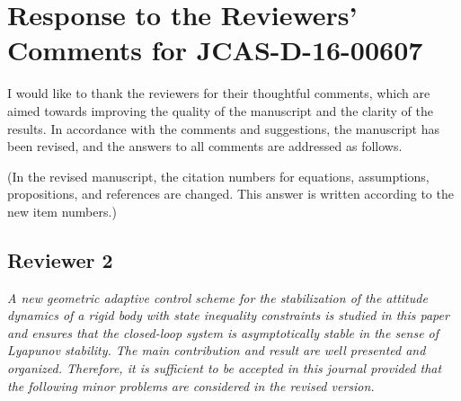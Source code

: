 \documentclass[11pt]{article}
\begin{document}

\section*{Response to the Reviewers' Comments for JCAS-D-16-00607}

I would like to thank the reviewers for their thoughtful comments, which are aimed towards improving the quality of the manuscript and the clarity of the results. 
In accordance with the comments and suggestions, the manuscript has been revised, and the answers to all comments are addressed as follows.

(In the revised manuscript, the citation numbers for equations, assumptions, propositions, and references are changed. This answer is written according to the new item numbers.)

\subsection*{Reviewer 2}

\textit{A new geometric adaptive control scheme for the stabilization of the attitude dynamics of a rigid body with state inequality constraints is studied in this paper and ensures that the closed-loop system is asymptotically stable in the sense of Lyapunov stability. The main contribution and result are well presented and organized. Therefore, it is sufficient to be accepted in this journal provided that the following minor problems are considered in the revised version.
}
\end{document}
